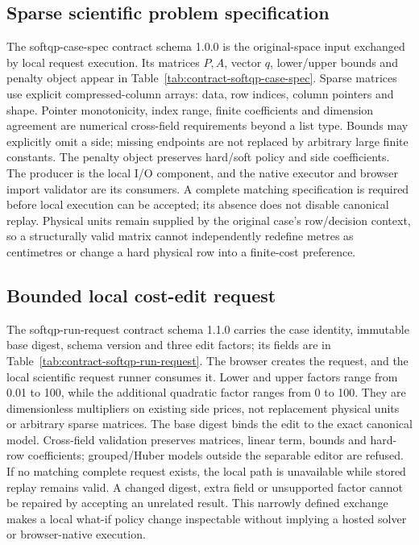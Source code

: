 \subsection{Sparse scientific problem specification}\label{sec:contract-softqp-case-spec}
The softqp-case-spec contract schema 1.0.0 is the original-space input exchanged
by local request execution. Its matrices $P,A$, vector $q$, lower/upper bounds
and penalty object appear in Table~\ref{tab:contract-softqp-case-spec}. Sparse
matrices use explicit compressed-column arrays: data, row indices, column
pointers and shape. Pointer monotonicity, index range, finite coefficients and
dimension agreement are numerical cross-field requirements beyond a list type.
Bounds may explicitly omit a side; missing endpoints are not replaced by
arbitrary large finite constants. The penalty object preserves hard/soft
policy and side coefficients. The producer is the local I/O component, and
the native executor and browser import validator are its consumers. A complete
matching specification is required before local execution can be accepted;
its absence does not disable canonical replay. Physical units remain supplied
by the original case's row/decision context, so a structurally valid matrix
cannot independently redefine metres as centimetres or change a hard physical
row into a finite-cost preference.


\subsection{Bounded local cost-edit request}\label{sec:contract-softqp-run-request}
The softqp-run-request contract schema 1.1.0 carries the case identity, immutable
base digest, schema version and three edit factors; its fields are in
Table~\ref{tab:contract-softqp-run-request}. The browser creates the request,
and the local scientific request runner consumes it. Lower and upper factors
range from 0.01 to 100, while the additional quadratic factor ranges from 0 to 100.
They are dimensionless multipliers on existing side prices, not replacement
physical units or arbitrary sparse matrices. The base digest binds the edit
to the exact canonical model. Cross-field validation preserves matrices,
linear term, bounds and hard-row coefficients; grouped/Huber models outside
the separable editor are refused. If no matching complete request exists,
the local path is unavailable while stored replay remains valid. A changed
digest, extra field or unsupported factor cannot be repaired by accepting an
unrelated result. This narrowly defined exchange makes a local what-if policy
change inspectable without implying a hosted solver or browser-native execution.


